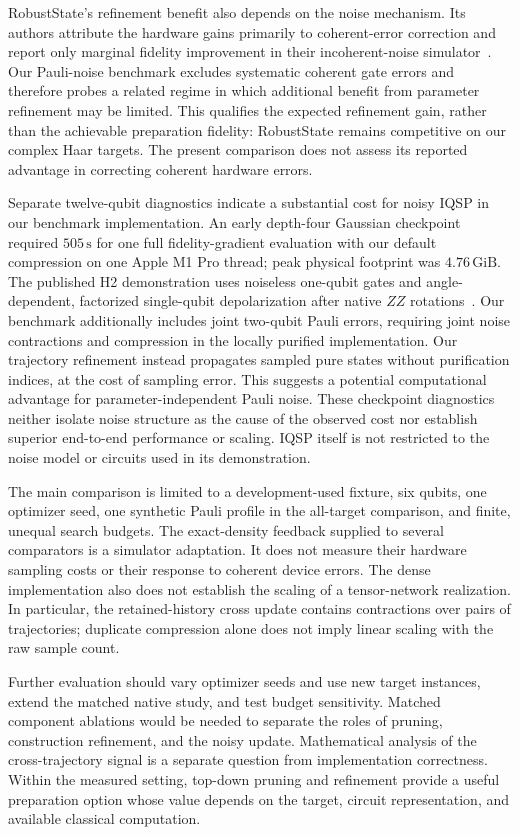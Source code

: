 RobustState's refinement benefit also depends on the noise mechanism.
Its authors attribute the hardware gains primarily to coherent-error
correction and report only marginal fidelity improvement in their
incoherent-noise simulator~\cite[Sec.~IV.C]{RobustState2024}.
Our Pauli-noise benchmark excludes systematic coherent gate errors and
therefore probes a related regime in which additional benefit from
parameter refinement may be limited. This qualifies the expected
refinement gain, rather than the achievable preparation fidelity:
RobustState remains competitive on our complex Haar targets.
The present comparison does not assess its reported advantage in
correcting coherent hardware errors.

Separate twelve-qubit diagnostics indicate a substantial cost for noisy
IQSP in our benchmark implementation. An early depth-four Gaussian
checkpoint required $505\,\mathrm{s}$ for one full fidelity-gradient
evaluation with our default compression on one Apple M1 Pro thread; peak
physical footprint was $4.76\,\mathrm{GiB}$.
The published H2 demonstration uses noiseless one-qubit gates and
angle-dependent, factorized single-qubit depolarization after native $ZZ$
rotations~\cite{Ballarin2025}. Our benchmark additionally includes joint
two-qubit Pauli errors, requiring joint noise contractions and compression
in the locally purified implementation. Our trajectory refinement instead
propagates sampled pure states without purification indices, at the cost
of sampling error. This suggests a potential computational advantage for
parameter-independent Pauli noise. These checkpoint diagnostics neither
isolate noise structure as the cause of the observed cost nor establish
superior end-to-end performance or scaling. IQSP itself is not restricted
to the noise model or circuits used in its demonstration.

The main comparison is limited to a development-used fixture, six qubits, one
optimizer seed, one synthetic Pauli profile in the all-target comparison,
and finite, unequal search budgets. The exact-density feedback supplied
to several comparators is a simulator adaptation. It does not measure
their hardware sampling costs or their response to coherent device
errors. The dense implementation also does not establish the scaling of
a tensor-network realization. In particular, the retained-history cross
update contains contractions over pairs of trajectories; duplicate
compression alone does not imply linear scaling with the raw sample
count.

Further evaluation should vary optimizer seeds and use new target
instances, extend the matched native study, and test budget sensitivity.
Matched component ablations would be needed to separate the roles of
pruning, construction refinement, and the noisy update. Mathematical
analysis of the cross-trajectory signal is a separate question from
implementation correctness. Within the measured setting, top-down
pruning and refinement provide a useful preparation option whose value
depends on the target, circuit representation, and available classical
computation.
